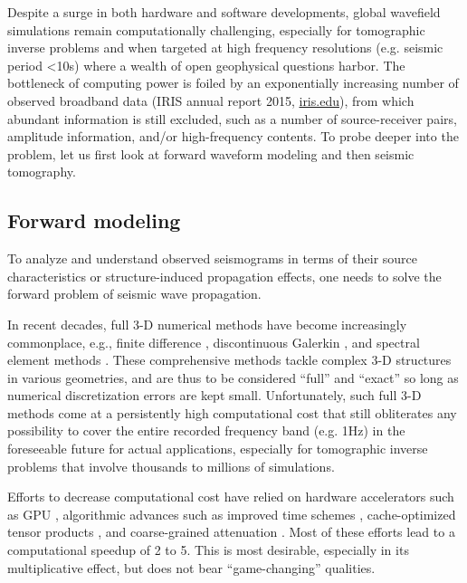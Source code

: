 \documentclass[extra]{gji}
\begin{document}
Despite a surge in both hardware and software developments,
global wavefield simulations remain computationally challenging, 
especially for tomographic inverse problems and when targeted at high frequency resolutions 
(e.g. seismic period \textless 10s) where a wealth of open geophysical 
questions harbor. The bottleneck of computing power is foiled
by an exponentially increasing number of observed broadband data
(IRIS annual report 2015, \url{iris.edu}), from which abundant
information is still excluded, such as a number of source-receiver pairs,
amplitude information, and/or high-frequency contents.
To probe deeper into the problem, let us first look at 
forward waveform modeling and then seismic tomography.

\subsection{Forward modeling}
To analyze and understand observed seismograms in terms of their source
characteristics or structure-induced propagation effects, one needs to
solve the forward problem of seismic wave propagation.

In recent decades, full 3-D numerical methods have become increasingly
commonplace, e.g.,
finite difference \cite[]{igel2002wave}, 
discontinuous Galerkin \cite[]{dumbser2006arbitrary},
and spectral element methods \cite[]{komatitsch2002spectralI, 
komatitsch2002spectralII, chaljub2007spectral, peter2011forward}.
These comprehensive methods tackle complex 3-D structures in
various geometries, and are thus to be considered ``full'' and
``exact'' so long as numerical discretization errors are kept small. 
Unfortunately, such full 3-D methods come at a persistently high 
computational cost that still obliterates any possibility to 
cover the entire recorded frequency band (e.g. 1Hz) in the
foreseeable future for actual applications, 
especially for tomographic inverse problems that involve 
thousands to millions of simulations.

Efforts to decrease computational cost have relied on hardware 
accelerators such as GPU \cite[]{komatitsch2011fluid, rietmann2012forward},
algorithmic advances such as improved time schemes 
\cite[]{rietmann2015load, ma2014low, nissen2008sem}, 
cache-optimized tensor products \cite[Chap 8,][]{deville2002high,
nissen2007sem}, and coarse-grained attenuation \cite[]{van2014optimized}.
Most of these efforts lead to a computational speedup
of 2 to 5. This is most desirable, especially in its multiplicative effect,
but does not bear ``game-changing'' qualities.
\end{document}
